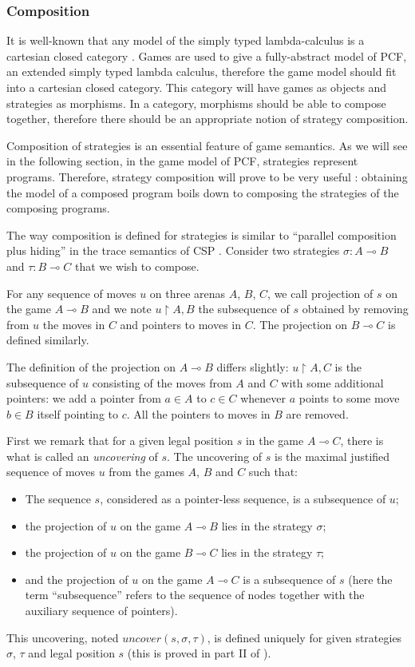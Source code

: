 \subsubsection{Composition}

It is well-known that any model of the simply typed lambda-calculus
is a cartesian closed category \citep{CroleRL:catt}. Games are used
to give a fully-abstract model of PCF, an extended simply typed
lambda calculus, therefore the game model should fit into a
cartesian closed category. This category will have games as objects
and strategies as morphisms. In a category, morphisms should be able
to compose together, therefore there should be an appropriate notion
of strategy composition.

Composition of strategies is an essential feature of game semantics.
As we will see in the following section, in the game model of PCF,
strategies represent programs. Therefore, strategy composition will
prove to be very useful : obtaining the model of a composed program
boils down to composing the strategies of the composing programs.

The way composition is defined for strategies is similar to
``parallel composition plus hiding'' in the trace semantics of CSP
\citep{hoare_csp}. Consider two strategies $\sigma : A \multimap B$
and $\tau : B \multimap C$ that we wish to compose.

For any sequence of moves $u$ on three arenas $A$, $B$, $C$, we call
projection of $s$ on the game $A \multimap B$ and we note $u
\upharpoonright A,B$ the subsequence of $s$ obtained by removing
from $u$ the moves in $C$ and pointers to moves in $C$. The
projection on $B \multimap C$ is defined similarly.

The definition of the projection on $A \multimap B$ differs
slightly: $u \upharpoonright A,C$ is the subsequence of $u$
consisting of the moves from $A$ and $C$ with some additional
pointers: we add a pointer from $a \in A$ to $c\in C$ whenever $a$
points to some move $b \in B$ itself pointing to $c$. All the
pointers to moves in $B$ are removed.


First we remark that for a given legal position $s$ in the game $A
\multimap C$, there is what is called an \emph{uncovering} of $s$.
The uncovering of $s$ is the maximal justified sequence of moves $u$
from the games $A$, $B$ and $C$ such that:
\begin{itemize}
\item The sequence $s$, considered as a pointer-less sequence, is a subsequence of
$u$;
\item the projection of $u$ on the game $A \multimap B$ lies in the
strategy $\sigma$;
\item the projection of $u$ on the game $B \multimap C$
lies in the strategy $\tau$;
\item and the projection of $u$ on the game $A \multimap C$ is a subsequence of $s$ (here the term ``subsequence'' refers to the sequence of nodes together with the auxiliary sequence of pointers).
\end{itemize}
This uncovering, noted $uncover(s, \sigma, \tau)$, is
defined uniquely for given strategies $\sigma$, $\tau$ and legal
position $s$ (this is proved in part II of \cite{hylandong_pcf}).

